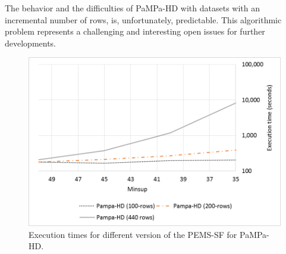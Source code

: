The behavior and the difficulties of PaMPa-HD with datasets with an incremental number of rows, is, unfortunately, predictable. This algorithmic problem represents a challenging and interesting open issues for further developments.
\begin{figure}[!t]
\includegraphics[width=5in]{immagini_extension/pampa_pems_confronto.png}
\caption{Execution times for different version of the PEMS-SF for PaMPa-HD.}
\label{pampa_pems_confronto}
\end{figure}

%


